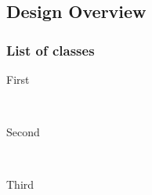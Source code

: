 \documentclass[12pt]{article} %
\begin{document}
\subsection{Design Overview}
\subsubsection{List of classes}

\begin{description} %

\item[First] \hfill \\


\item[Second] \hfill \\


\item[Third] \hfill \\


\end{description} 


\vfill








\end{document}
